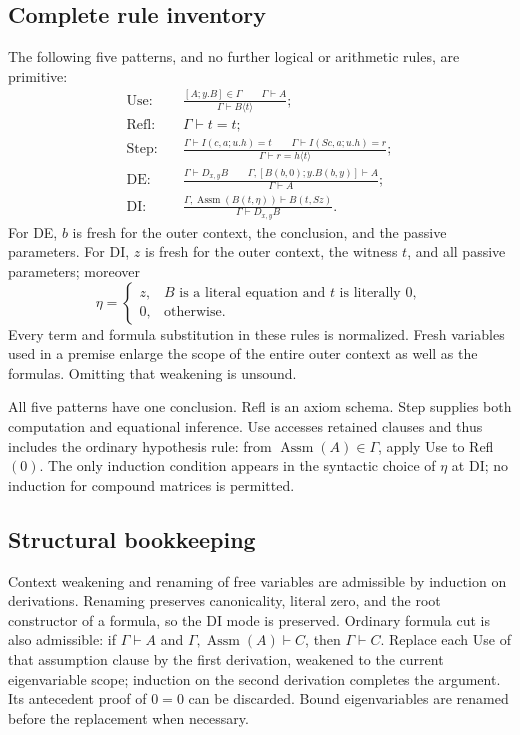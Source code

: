 \subsection{Complete rule inventory}

The following five patterns, and no further logical or arithmetic rules,
are primitive:
\begin{align*}
 \text{Use:}\quad&
 \frac{[A;y.B]\in\Gamma\qquad\Gamma\vdash A}
      {\Gamma\vdash B\langle t\rangle};\\[2mm]
 \text{Refl:}\quad&\Gamma\vdash t=t;\\[2mm]
 \text{Step:}\quad&
 \frac{\Gamma\vdash I(c,a;u.h)=t\qquad
       \Gamma\vdash I(Sc,a;u.h)=r}
      {\Gamma\vdash r=h\langle t\rangle};\\[2mm]
 \text{DE:}\quad&
 \frac{\Gamma\vdash D_{x,y}B\qquad
       \Gamma,[B(b,0);y.B(b,y)]\vdash A}
      {\Gamma\vdash A};\\[2mm]
 \text{DI:}\quad&
 \frac{\Gamma,\operatorname{Assm}(B(t,\eta))
          \vdash B(t,Sz)}
      {\Gamma\vdash D_{x,y}B}.
\end{align*}
For DE, $b$ is fresh for the outer context, the conclusion, and the
passive parameters. For DI, $z$ is fresh for the outer context, the
witness $t$, and all passive parameters; moreover
\[
 \eta=\begin{cases}
 z,& B\text{ is a literal equation and }t\text{ is literally }0,\\
 0,&\text{otherwise}.
 \end{cases}
\]
Every term and formula substitution in these rules is normalized.
Fresh variables used in a premise enlarge the scope of the entire outer
context as well as the formulas. Omitting that weakening is unsound.

All five patterns have one conclusion. Refl is an axiom schema.
Step supplies both computation and equational inference. Use accesses
retained clauses and thus includes the ordinary hypothesis rule:
from $\operatorname{Assm}(A)\in\Gamma$, apply Use to Refl$(0)$.
The only induction condition appears in the syntactic choice of
$\eta$ at DI; no induction for compound matrices is permitted.

\subsection{Structural bookkeeping}

Context weakening and renaming of free variables are admissible by
induction on derivations. Renaming preserves canonicality, literal zero,
and the root constructor of a formula, so the DI mode is preserved.
Ordinary formula cut is also admissible: if
$\Gamma\vdash A$ and $\Gamma,\operatorname{Assm}(A)\vdash C$, then
$\Gamma\vdash C$. Replace each Use of that assumption clause by the
first derivation, weakened to the current eigenvariable scope; induction
on the second derivation completes the argument. Its antecedent proof
of $0=0$ can be discarded. Bound eigenvariables are renamed before the
replacement when necessary.

